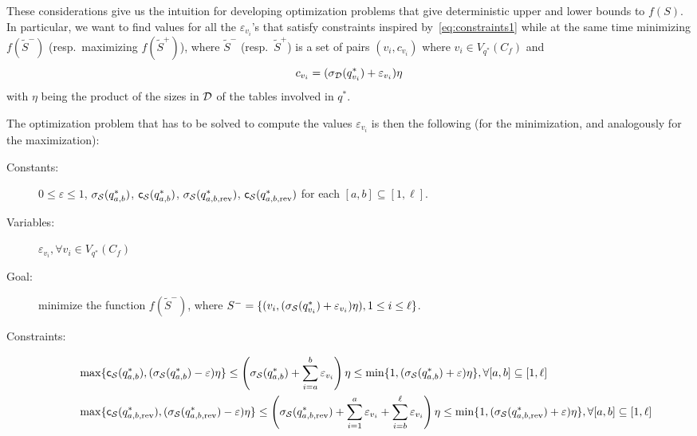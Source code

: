 These considerations give us the intuition for developing optimization
problems that give deterministic upper and lower bounds to $f(S)$.
In particular, we want to find values for all the $\varepsilon_{v_i}$'s that
satisfy constraints inspired by~\eqref{eq:constraints1} while at the same
time minimizing $f(\tilde S^-)$ (resp.~maximizing $f(\tilde S^+)$), where
$\tilde S^-$ (resp.~$\tilde S^+$) is a set of pairs
$(v_i,c_{v_i})$ where $v_i\in V_{q^*}(C_f)$ and 
\[
c_{v_i} = (\sigma_{\cal D}(q^*_{v_i})+\varepsilon_{v_i})\eta
\]
with $\eta$ being the product of the sizes in ${\cal D}$ of the tables involved in
$q^*$.

The optimization problem that has to be solved to compute the values
$\varepsilon_{v_i}$ is then the following (for the minimization, and analogously
for the maximization):
\begin{description}
  \item[Constants:] $0\le\varepsilon\le 1$,
    $\sigma_{\cal S}(q^*_{a,b})$, $\mathsf{c}_{\cal S}(q^*_{a,b})$,
    $\sigma_{\cal S}(q^*_{a,b,\mathrm{rev}})$,
    $\mathsf{c}_{\cal S}(q^*_{a,b,\mathrm{rev}})$ for each $[a,b]\subseteq[1,\ell]$.
  \item[Variables:] $\varepsilon_{v_i}, \forall v_i\in V_{q^*}(C_f)$ 
  \item[Goal:] minimize the function $f(\tilde S^-)$, where
    $S^-=\{(v_i,(\sigma_{\cal S}(q^*_{v_i})+\varepsilon_{v_i})\eta), 1\le i\le
    \ell\}$.
  \item[Constraints:]
    \begin{align*}
    &\max\{\mathsf{c}_{\cal S}(q^*_{a,b}),
    (\sigma_{\cal S}(q^*_{a,b})-\varepsilon)\eta\} \le
    \left(\sigma_{\cal S}(q^*_{a,b})+\sum_{i=a}^b\varepsilon_{v_i}\right)\eta \le
    \min\{1,(\sigma_{\cal S}(q^*_{a,b})+\varepsilon)\eta\}, \forall
    [a,b]\subseteq[1,\ell] \\
    &\max\{\mathsf{c}_{\cal S}(q^*_{a,b,\mathrm{rev}}),
    (\sigma_{\cal S}(q^*_{a,b,\mathrm{rev}})-\varepsilon)\eta\} \le
    \left(\sigma_{\cal S}(q^*_{a,b,\mathrm{rev}})+\sum_{i=1}^a\varepsilon_{v_i}+\sum_{i=b}^\ell\varepsilon_{v_i}\right)\eta \le
    \min\{1,(\sigma_{\cal S}(q^*_{a,b,\mathrm{rev}})+\varepsilon)\eta\}, \forall [a,b]\subseteq[1,\ell]
    \end{align*}
\end{description}

